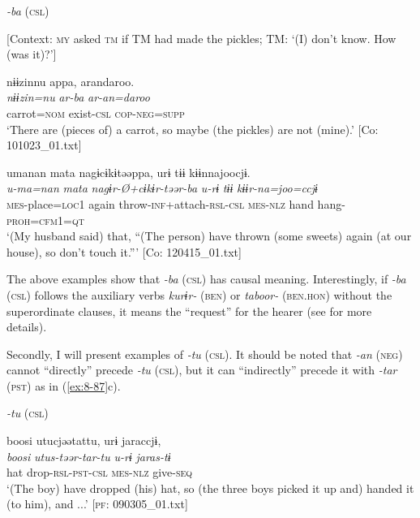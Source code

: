 \ea\label{ex:8-86}
  \textit{-ba} (\textsc{csl})

\ea {}[Context: \textsc{my} asked \textsc{tm} if TM had made the pickles; TM: ‘(I) don’t know. How (was it)?’]

{\TM}
\glll  nɨɨzinnu  appa,  arandaroo.\\
\textit{nɨɨzin=nu}  \textit{ar-ba}  \textit{ar-an=daroo}\\
carrot=\textsc{nom}  exist-\textsc{csl}  \textsc{cop}-\textsc{neg}=\textsc{supp}\\
\glt ‘There are (pieces of) a carrot, so maybe (the pickles) are not (mine).’ [Co: 101023\_01.txt]

\ex
{\TM}
\glll  umanan  mata  nagɨcɨkɨtəəppa,      urɨ  tɨɨ  kɨɨnnajoocjɨ.\\
\textit{u-ma=nan}  \textit{mata}  \textit{nagɨr-Ø+cɨkɨr-təər-ba}      \textit{u-rɨ}  \textit{tɨɨ}  \textit{kɨɨr-na=joo=ccjɨ}\\
\textsc{mes}-place=\textsc{loc1}  again  throw-\textsc{inf}+attach-\textsc{rsl}-\textsc{csl}  \textsc{mes}-\textsc{nlz}  hand  hang-\textsc{proh}=\textsc{cfm1}=\textsc{qt}\\
\glt ‘(My husband said) that, “(The person) have thrown (some sweets) again (at our house), so don’t touch it.”’ [Co: 120415\_01.txt]
\z
\z

The above examples show that \textit{-ba} (\textsc{csl}) has causal meaning. Interestingly, if \textit{-ba} (\textsc{csl}) follows the auxiliary verbs \textit{kurɨr-} (\textsc{ben}) or \textit{taboor-} (\textsc{ben}.\textsc{hon}) without the superordinate clauses, it means the “request” for the hearer (see  for more details).

  Secondly, I will present examples of \textit{-tu} (\textsc{csl}). It should be noted that \textit{-an} (\textsc{neg}) cannot “directly” precede \textit{-tu} (\textsc{csl}), but it can “indirectly” precede it with \textit{-tar} (\textsc{pst}) as in (\ref{ex:8-87}c).

\ea\label{ex:8-87}
  \textit{-tu} (\textsc{csl})

\ea
{\TM}
\glll  boosi  utucjəətattu,  urɨ  jaraccjɨ,\\
\textit{boosi}  \textit{utus-təər-tar-tu}  \textit{u-rɨ}  \textit{jaras-tɨ}\\
hat  drop-\textsc{rsl}-\textsc{pst}-\textsc{csl}  \textsc{mes}-\textsc{nlz}  give-\textsc{seq}\\
\glt ‘(The boy) have dropped (his) hat, so (the three boys picked it up and) handed it (to him), and ...’ [\textsc{pf}: 090305\_01.txt]


